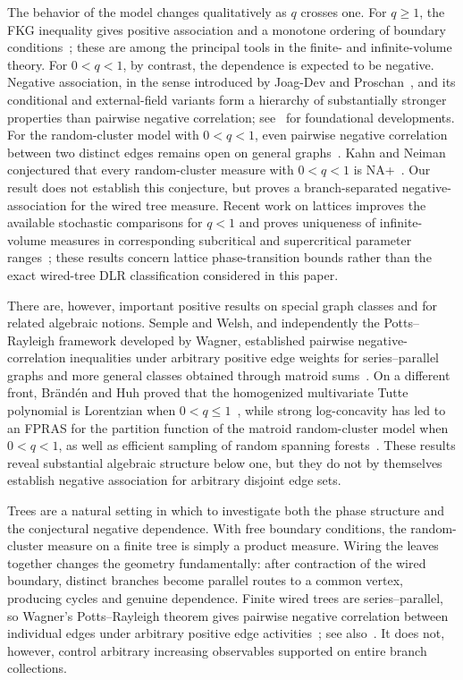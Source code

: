\documentclass[11pt]{amsart}
\theoremstyle{plain}
\theoremstyle{definition}
\theoremstyle{remark}
\begin{document}
The behavior of the model changes qualitatively as $q$ crosses one. For $q\ge1$, the FKG inequality gives positive association and a monotone ordering of boundary conditions~\cite{fortuinKasteleynGinibre1971,grimmett2006randomcluster}; these are among the principal tools in the finite- and infinite-volume theory. For $0<q<1$, by contrast, the dependence is expected to be negative. Negative association, in the sense introduced by Joag-Dev and Proschan~\cite{joagDevProschan1983}, and its conditional and external-field variants form a hierarchy of substantially stronger properties than pairwise negative correlation; see~\cite{borceaBrandenLiggett2009,kahnNeiman2010negative,pemantle2000towards} for foundational developments. For the random-cluster model with $0<q<1$, even pairwise negative correlation between two distinct edges remains open on general graphs~\cite{grimmettWinkler2004negative,pemantle2000towards}. Kahn and Neiman conjectured that every random-cluster measure with $0<q<1$ is NA+~\cite{kahnNeiman2010negative}. Our result does not establish this conjecture, but proves a branch-separated negative-association for the wired tree measure. Recent work on lattices improves the available stochastic comparisons for $q<1$ and proves uniqueness of infinite-volume measures in corresponding subcritical and supercritical parameter ranges~\cite{beffaraFaipeurOke2025}; these results concern lattice phase-transition bounds rather than the exact wired-tree DLR classification considered in this paper.

There are, however, important positive results on special graph classes and for related algebraic notions. Semple and Welsh, and independently the Potts--Rayleigh framework developed by Wagner, established pairwise negative-correlation inequalities under arbitrary positive edge weights for series--parallel graphs and more general classes obtained through matroid sums~\cite{sempleWelsh2008negative,wagner2008mason}. On a different front, Br{\"a}nd{\'e}n and Huh proved that the homogenized multivariate Tutte polynomial is Lorentzian when $0<q\le1$~\cite{brandenHuh2020lorentzian}, while strong log-concavity has led to an FPRAS for the partition function of the matroid random-cluster model when $0<q<1$, as well as efficient sampling of random spanning forests~\cite{anariEtAl2024logConcave}. These results reveal substantial algebraic structure below one, but they do not by themselves establish negative association for arbitrary disjoint edge sets.

Trees are a natural setting in which to investigate both the phase structure and the conjectural negative dependence. With free boundary conditions, the random-cluster measure on a finite tree is simply a product measure. Wiring the leaves together changes the geometry fundamentally: after contraction of the wired boundary, distinct branches become parallel routes to a common vertex, producing cycles and genuine dependence. Finite wired trees are series--parallel, so Wagner's Potts--Rayleigh theorem gives pairwise negative correlation between individual edges under arbitrary positive edge activities~\cite{wagner2008mason}; see also~\cite{sempleWelsh2008negative}. It does not, however, control arbitrary increasing observables supported on entire branch collections.
\end{document}
